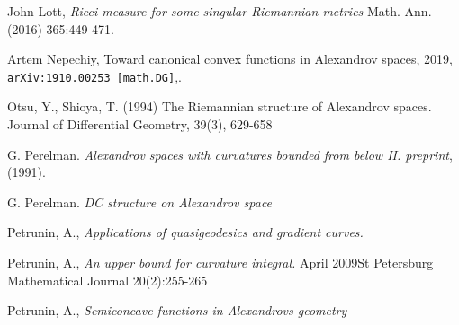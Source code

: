 \begin{thebibliography}{52}
 John Lott,\textit{
Ricci measure for some singular Riemannian metrics}
Math. Ann. (2016) 365:449-471.

 Artem Nepechiy,
Toward canonical convex functions in Alexandrov spaces, 
2019,
\texttt{arXiv:1910.00253 [math.DG]},.

   Otsu, Y.,  Shioya, T. (1994)
The Riemannian structure of Alexandrov spaces. Journal of Differential Geometry, 39(3), 629-658

 G. Perelman. \textit{Alexandrov spaces with curvatures bounded from below II. preprint}, (1991).

 G. Perelman. \textit{DC structure on Alexandrov space}

 Petrunin, A., \textit{Applications of quasigeodesics
and gradient curves.}

 Petrunin, A., \textit{An upper bound for curvature integral.} April 2009St Petersburg Mathematical Journal 20(2):255-265

 Petrunin, A., \textit{Semiconcave functions in Alexandrovs geometry}

\end{thebibliography}
